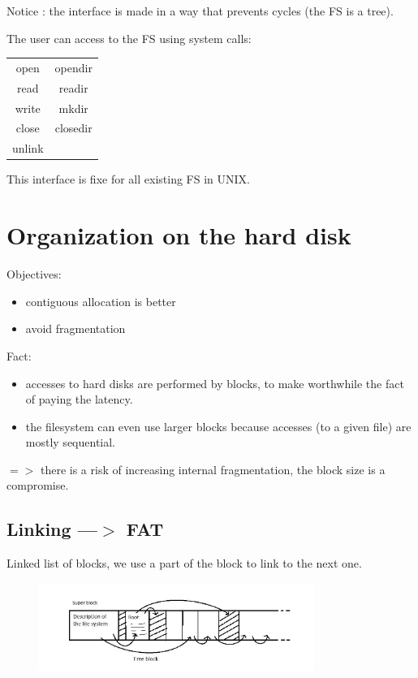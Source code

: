   Notice : the interface is made in a way that prevents cycles (the FS is a tree).
  
  The user can access to the FS using system calls:

    \begin{center}
      \begin{tabular}{c|c}
         open & opendir \\
         read & readir \\
         write & mkdir \\
         close & closedir \\
         unlink & \\
      \end{tabular}
    \end{center}
This interface is fixe for all existing FS in UNIX.

\section{Organization on the hard disk}

Objectives:

\begin{itemize}
  \item contiguous allocation is better
  \item avoid fragmentation
\end{itemize}

Fact:

\begin{itemize}
  \item accesses to hard disks are performed by blocks, to make worthwhile the fact of paying the latency.
  \item the filesystem can even use larger blocks because accesses (to a given file) are mostly sequential.
  
\end{itemize}

$=>$ there is a risk of increasing internal fragmentation, the block size is a compromise.

\subsection{Linking ---$>$ FAT}

Linked list of blocks, we use a part of the block to link to the next one.

 \begin{figure}[h!]
  \begin{center}
    \includegraphics[width=0.8\textwidth]{fat.jpg}
  \end{center}
\end{figure}

